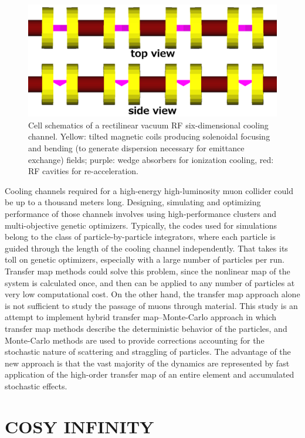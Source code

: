 \documentclass{jacow}
\begin{document}
\begin{figure}[htbf] 
\centering
\includegraphics[width=\columnwidth]{Figures/vcc}
\caption{Cell schematics of a rectilinear vacuum RF six-dimensional cooling channel. Yellow: tilted magnetic coils producing solenoidal focusing and bending (to generate dispersion necessary for emittance exchange) fields; purple: wedge absorbers for ionization cooling, red: RF cavities for re-acceleration.}
\label{fig:vcc}
\end{figure}

Cooling channels required for a high-energy high-luminosity muon collider could be up to a thousand meters long. Designing, simulating and optimizing performance of those channels involves using high-performance clusters and multi-objective genetic optimizers. Typically, the codes used for simulations belong to the class of particle-by-particle integrators, where each particle is guided through the length of the cooling channel independently. That takes its toll on genetic optimizers, especially with a large number of particles per run. Transfer map methods could solve this problem, since the nonlinear map of the system is calculated once, and then can be applied to any number of particles at very low computational cost. On the other hand, the transfer map approach alone is not sufficient to study the passage of muons through material. This study is an attempt to implement hybrid transfer map--Monte-Carlo approach in which transfer map methods describe the deterministic behavior of the particles, and Monte-Carlo methods are used to provide corrections accounting for the stochastic nature of scattering and straggling of particles. The advantage of the new approach is that the vast majority of the dynamics are represented by fast application of the high-order transfer map of an entire element and accumulated stochastic effects.

\section{COSY INFINITY}
\end{document}
